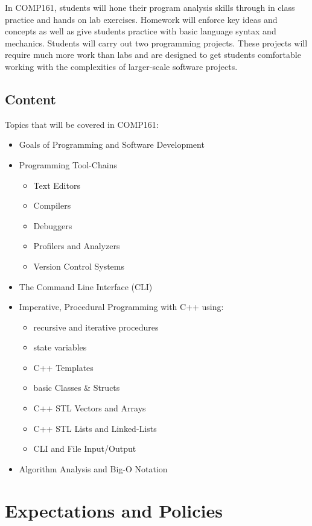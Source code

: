 \documentclass[10pt]{article}
\begin{document}
In COMP161, students will hone their program analysis skills through in class practice and hands on lab exercises.  Homework will enforce key ideas and concepts as well as give students practice with basic language syntax and mechanics.  Students will carry out two programming projects.  These projects will require much more work than labs and are designed to get students comfortable working with the complexities of larger-scale software projects.

\subsection{Content}

Topics that will be covered in COMP161:
\begin{itemize}
\item Goals of Programming and Software Development
\item Programming Tool-Chains
\begin{itemize}
\item Text Editors
\item Compilers
\item Debuggers
\item Profilers and Analyzers
\item Version Control Systems
\end{itemize}
\item The Command Line Interface (CLI) 
\item Imperative, Procedural Programming with C++ using:
\begin{itemize}
\item recursive and iterative procedures
\item state variables
\item C++ Templates
\item basic Classes \& Structs
\item C++ STL Vectors and Arrays
\item C++ STL Lists and Linked-Lists
\item CLI and File Input/Output
\end{itemize}
\item Algorithm Analysis and Big-O Notation
\end{itemize}  


\section{Expectations and Policies}
\end{document}

